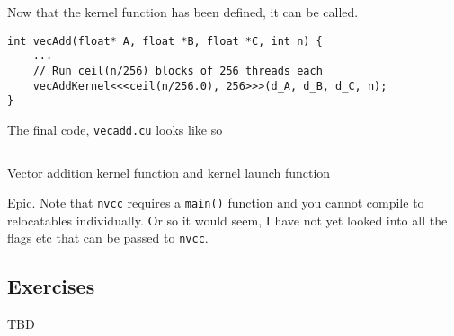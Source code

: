 Now that the kernel function has been defined, it can be called.
\begin{verbatim}
int vecAdd(float* A, float *B, float *C, int n) {
    ...
    // Run ceil(n/256) blocks of 256 threads each
    vecAddKernel<<<ceil(n/256.0), 256>>>(d_A, d_B, d_C, n);
}
\end{verbatim}

The final code, \texttt{vecadd.cu} looks like so
\begin{code}
\inputminted[samepage=false, breaklines, linenos]{c}{../codes/vecadd.cu}
\label{lst:vecaddfinal}
\caption{Vector addition kernel function and kernel launch function}
\end{code}

Epic. Note that \texttt{nvcc} requires a \texttt{main()} function
and you cannot compile to relocatables individually. Or so it would
seem, I have not yet looked into all the flags etc that can be
passed to \texttt{nvcc}.

\subsection*{Exercises}
TBD

